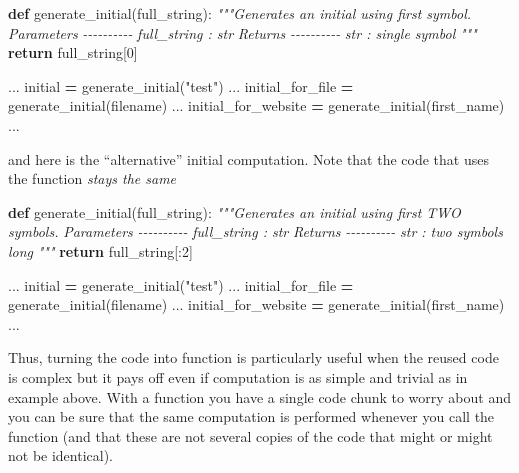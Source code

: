 \documentclass[
]{book}
\newenvironment{Shaded}{\begin{snugshade}}{\end{snugshade}}
\newcommand{\CommentTok}[1]{\textcolor[rgb]{0.56,0.35,0.01}{\textit{#1}}}
\newcommand{\ControlFlowTok}[1]{\textcolor[rgb]{0.13,0.29,0.53}{\textbf{#1}}}
\newcommand{\DecValTok}[1]{\textcolor[rgb]{0.00,0.00,0.81}{#1}}
\newcommand{\KeywordTok}[1]{\textcolor[rgb]{0.13,0.29,0.53}{\textbf{#1}}}
\newcommand{\NormalTok}[1]{#1}
\newcommand{\OperatorTok}[1]{\textcolor[rgb]{0.81,0.36,0.00}{\textbf{#1}}}
\newcommand{\StringTok}[1]{\textcolor[rgb]{0.31,0.60,0.02}{#1}}
\begin{document}
\begin{Shaded}
\begin{Highlighting}[]
\KeywordTok{def}\NormalTok{ generate\_initial(full\_string):}
    \CommentTok{"""Generates an initial using first symbol.}
\CommentTok{    }
\CommentTok{    Parameters}
\CommentTok{    {-}{-}{-}{-}{-}{-}{-}{-}{-}{-}}
\CommentTok{    full\_string : str}
\CommentTok{    }
\CommentTok{    Returns}
\CommentTok{    {-}{-}{-}{-}{-}{-}{-}{-}{-}{-}}
\CommentTok{    str : single symbol}
\CommentTok{    """}
    \ControlFlowTok{return}\NormalTok{ full\_string[}\DecValTok{0}\NormalTok{]}

\NormalTok{...}
\NormalTok{initial }\OperatorTok{=}\NormalTok{ generate\_initial(}\StringTok{"test"}\NormalTok{)}
\NormalTok{...}
\NormalTok{initial\_for\_file }\OperatorTok{=}\NormalTok{ generate\_initial(filename)}
\NormalTok{...}
\NormalTok{initial\_for\_website }\OperatorTok{=}\NormalTok{ generate\_initial(first\_name)}
\NormalTok{...}
\end{Highlighting}
\end{Shaded}

and here is the ``alternative'' initial computation. Note that the code that uses the function \emph{stays the same}

\begin{Shaded}
\begin{Highlighting}[]
\KeywordTok{def}\NormalTok{ generate\_initial(full\_string):}
    \CommentTok{"""Generates an initial using first TWO symbols.}
\CommentTok{    }
\CommentTok{    Parameters}
\CommentTok{    {-}{-}{-}{-}{-}{-}{-}{-}{-}{-}}
\CommentTok{    full\_string : str}
\CommentTok{    }
\CommentTok{    Returns}
\CommentTok{    {-}{-}{-}{-}{-}{-}{-}{-}{-}{-}}
\CommentTok{    str : two symbols long}
\CommentTok{    """}
    \ControlFlowTok{return}\NormalTok{ full\_string[:}\DecValTok{2}\NormalTok{]}

\NormalTok{...}
\NormalTok{initial }\OperatorTok{=}\NormalTok{ generate\_initial(}\StringTok{"test"}\NormalTok{)}
\NormalTok{...}
\NormalTok{initial\_for\_file }\OperatorTok{=}\NormalTok{ generate\_initial(filename)}
\NormalTok{...}
\NormalTok{initial\_for\_website }\OperatorTok{=}\NormalTok{ generate\_initial(first\_name)}
\NormalTok{...}
\end{Highlighting}
\end{Shaded}

Thus, turning the code into function is particularly useful when the reused code is complex but it pays off even if computation is as simple and trivial as in example above. With a function you have a single code chunk to worry about and you can be sure that the same computation is performed whenever you call the function (and that these are not several copies of the code that might or might not be identical).
\end{document}
